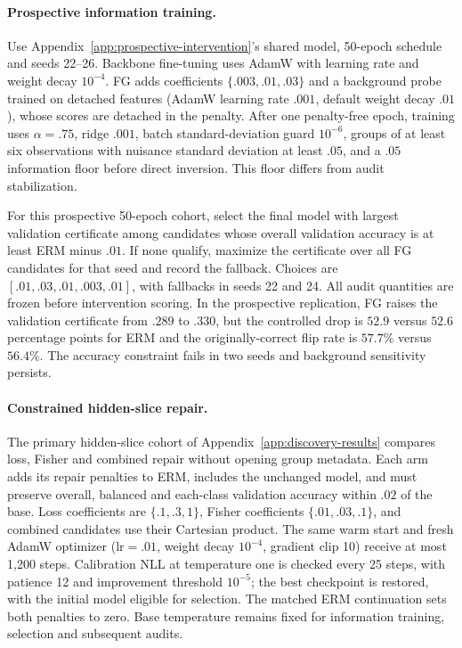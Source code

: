 \paragraph{Prospective information training.}
Use Appendix~\ref{app:prospective-intervention}'s shared model, 50-epoch schedule and seeds 22--26. Backbone fine-tuning uses AdamW with learning rate and weight decay $10^{-4}$. FG adds coefficients $\{.003,.01,.03\}$ and a background probe trained on detached features (AdamW learning rate $.001$, default weight decay $.01$), whose scores are detached in the penalty. After one penalty-free epoch, training uses $\alpha=.75$, ridge $.001$, batch standard-deviation guard $10^{-6}$, groups of at least six observations with nuisance standard deviation at least $.05$, and a $.05$ information floor before direct inversion. This floor differs from audit stabilization.

For this prospective 50-epoch cohort, select the final model with largest validation certificate among candidates whose overall validation accuracy is at least ERM minus $.01$. If none qualify, maximize the certificate over all FG candidates for that seed and record the fallback. Choices are $[.01,.03,.01,.003,.01]$, with fallbacks in seeds 22 and 24. All audit quantities are frozen before intervention scoring. In the prospective replication, FG raises the validation certificate from $.289$ to $.330$, but the controlled drop is $52.9$ versus $52.6$ percentage points for ERM and the originally-correct flip rate is $57.7\%$ versus $56.4\%$. The accuracy constraint fails in two seeds and background sensitivity persists.

\paragraph{Constrained hidden-slice repair.}
The primary hidden-slice cohort of Appendix~\ref{app:discovery-results} compares loss, Fisher and combined repair without opening group metadata. Each arm adds its repair penalties to ERM, includes the unchanged model, and must preserve overall, balanced and each-class validation accuracy within $.02$ of the base. Loss coefficients are $\{.1,.3,1\}$, Fisher coefficients $\{.01,.03,.1\}$, and combined candidates use their Cartesian product. The same warm start and fresh AdamW optimizer ($\mathrm{lr}=.01$, weight decay $10^{-4}$, gradient clip 10) receive at most 1,200 steps. Calibration NLL at temperature one is checked every 25 steps, with patience 12 and improvement threshold $10^{-5}$; the best checkpoint is restored, with the initial model eligible for selection. The matched ERM continuation sets both penalties to zero. Base temperature remains fixed for information training, selection and subsequent audits.


